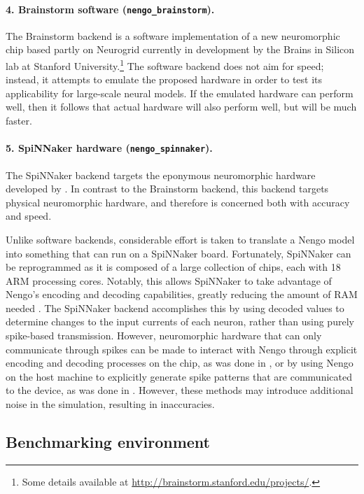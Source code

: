 \documentclass{frontiersSCNS}
\begin{document}
\paragraph{4. Brainstorm software (\texttt{nengo\_brainstorm}).}
The Brainstorm backend is a software implementation
of a new neuromorphic chip
based partly on Neurogrid \citep{benjamin2014}
currently in development
by the Brains in Silicon lab
at Stanford University.\footnote{
  Some details available at \url{http://brainstorm.stanford.edu/projects/}.}
The software backend does not aim for speed;
instead, it attempts to emulate the proposed hardware
in order to test its applicability
for large-scale neural models.
If the emulated hardware can perform well,
then it follows that actual hardware
will also perform well,
but will be much faster.

\paragraph{5. SpiNNaker hardware (\texttt{nengo\_spinnaker}).}
The SpiNNaker backend \citep{mundy2015}
targets the eponymous neuromorphic hardware
developed by \citet{furber2014}.
In contrast to the Brainstorm backend,
this backend targets physical neuromorphic hardware,
and therefore is concerned
both with accuracy and speed.

Unlike software backends,
considerable effort is taken
to translate a Nengo model into
something that can run on a SpiNNaker board.
Fortunately, SpiNNaker can be reprogrammed
as it is composed of a large collection
of chips, each with 18 ARM processing cores.
Notably, this allows SpiNNaker
to take advantage of Nengo's
encoding and decoding capabilities,
greatly reducing the amount of RAM needed
\citep{mundy2015}.
The SpiNNaker backend accomplishes this
by using decoded values to determine
changes to the input currents of each neuron,
rather than using purely
spike-based transmission.
However, neuromorphic hardware that
can only communicate through spikes
can be made to interact with Nengo
through explicit encoding and decoding processes
on the chip, as was done in \citet{galluppi2012},
or by using Nengo on the host machine
to explicitly generate spike patterns
that are communicated to the device,
as was done in \citet{choudhary2012}.
However, these methods may introduce
additional noise in the simulation,
resulting in inaccuracies.

\subsection{Benchmarking environment}
\end{document}
